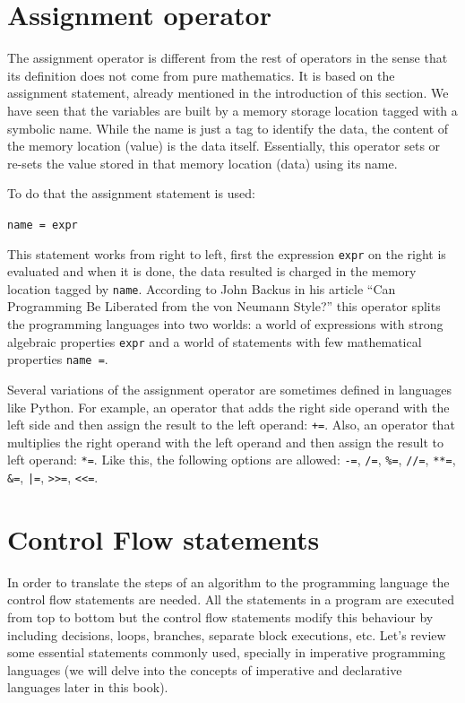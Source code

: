         
        
        
        

    \newpage
    \section{Assignment operator}
The assignment operator is different from the rest of operators in the sense that its 
definition does not come from pure mathematics. 
It is based on the assignment statement, already mentioned in the introduction of this section. 
We have seen that the variables are built by 
a memory storage location tagged with a symbolic name.
While the name is just a tag to identify the data,
the content of the memory location (value) is the data itself. 
Essentially, this operator sets or re-sets the value stored in that memory location (data) using its name. 

To do that the assignment statement is used: 

\texttt{name = expr}
 
This statement works from right to left, first the expression \texttt{expr} on the right is evaluated and
when it is done, the data resulted is charged in the memory location tagged by \texttt{name}.
According to John Backus in his article ``Can Programming Be Liberated from the von Neumann Style?'' 
this operator splits the programming languages into two worlds: 
a world of expressions with strong algebraic properties \texttt{expr} and 
a world of statements with few mathematical properties \texttt{name =}.

Several variations of the assignment operator are sometimes defined in languages like Python. 
For example, 
an operator that adds the right side operand with the left side and then assign the result to the left operand: \texttt{+=}.
Also, an operator that multiplies the right operand with the left operand and then assign the result to left operand: \texttt{*=}.
Like this, the following options are allowed: \texttt{-=}, \texttt{/=}, \texttt{\%=}, \texttt{//=}, \texttt{**=}, \texttt{\&=}, \texttt{|=}, \texttt{>>=}, \texttt{<<=}.  %



    \section{Control Flow statements}
In order to translate the steps of an algorithm to the programming language the control flow statements are needed. 
All the statements in a program are executed from top to bottom but 
the control flow statements modify this behaviour by including decisions, 
loops, branches, separate block executions, etc. 
Let's review some essential statements commonly used, 
specially in imperative programming languages 
(we will delve into the concepts of imperative and declarative languages later in this book).


